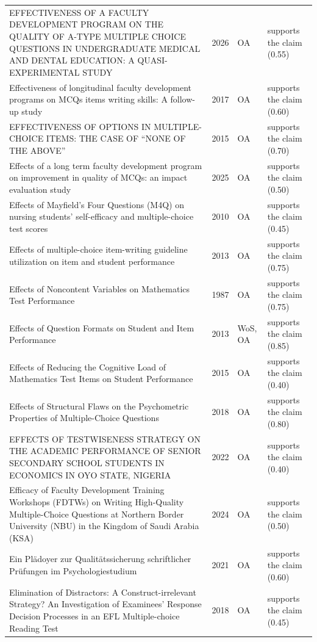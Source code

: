 \begin{longtable}{@{}%
  >{\raggedright\arraybackslash}p{}c%
  >{\raggedright\arraybackslash}p{}%
  >{\raggedright\arraybackslash}p{}@{}}
EFFECTIVENESS OF A FACULTY DEVELOPMENT PROGRAM ON THE QUALITY OF A-TYPE MULTIPLE CHOICE QUESTIONS IN UNDERGRADUATE MEDICAL AND DENTAL EDUCATION: A QUASI-EXPERIMENTAL STUDY & 2026 & OA & supports the claim (0.55) \\
Effectiveness of longitudinal faculty development programs on MCQs items writing skills: A follow-up study & 2017 & OA & supports the claim (0.60) \\
EFFECTIVENESS OF OPTIONS IN MULTIPLE-CHOICE ITEMS: THE CASE OF ``NONE OF THE ABOVE'' & 2015 & OA & supports the claim (0.70) \\
Effects of a long term faculty development program on improvement in quality of MCQs: an impact evaluation study & 2025 & OA & supports the claim (0.50) \\
Effects of Mayfield's Four Questions (M4Q) on nursing students' self-efficacy and multiple-choice test scores & 2010 & OA & supports the claim (0.45) \\
Effects of multiple-choice item-writing guideline utilization on item and student performance & 2013 & OA & supports the claim (0.75) \\
Effects of Noncontent Variables on Mathematics Test Performance & 1987 & OA & supports the claim (0.75) \\
Effects of Question Formats on Student and Item Performance & 2013 & WoS, OA & supports the claim (0.85) \\
Effects of Reducing the Cognitive Load of Mathematics Test Items on Student Performance & 2015 & OA & supports the claim (0.40) \\
Effects of Structural Flaws on the Psychometric Properties of Multiple-Choice Questions & 2018 & OA & supports the claim (0.80) \\
EFFECTS OF TESTWISENESS STRATEGY ON THE ACADEMIC PERFORMANCE OF SENIOR SECONDARY SCHOOL STUDENTS IN ECONOMICS IN OYO STATE, NIGERIA & 2022 & OA & supports the claim (0.40) \\
Efficacy of Faculty Development Training Workshops (FDTWs) on Writing High-Quality Multiple-Choice Questions at Northern Border University (NBU) in the Kingdom of Saudi Arabia (KSA) & 2024 & OA & supports the claim (0.50) \\
Ein Plädoyer zur Qualitätssicherung schriftlicher Prüfungen im Psychologiestudium & 2021 & OA & supports the claim (0.60) \\
Elimination of Distractors: A Construct-irrelevant Strategy? An Investigation of Examinees' Response Decision Processes in an EFL Multiple-choice Reading Test & 2018 & OA & supports the claim (0.45) \\

\end{longtable}
